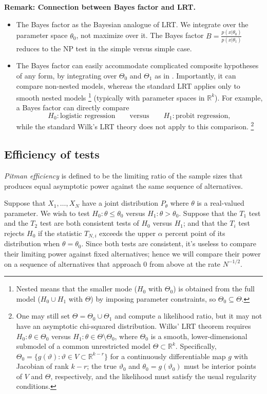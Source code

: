 \textbf{Remark: Connection between Bayes factor and LRT.}
\begin{itemize}
    \item The Bayes factor as the Bayesian analogue of LRT. We integrate over the parameter space $\theta_0$, not maximize over it. 
    The Bayes factor $B=\frac{p(x|\theta_0)}{p(x|\theta_1)}$ reduces to the NP test in the simple versus simple case.
    \item The Bayes factor can easily accommodate complicated composite hypotheses of any form, by integrating over $\Theta_0$ and $\Theta_1$ as in .
    Importantly, it can compare non-nested models, whereas the standard LRT applies only to smooth nested models
    \footnote{Nested means that the smaller mode ($H_0$ with $\Theta_0$) is obtained from the full model ($H_0 \cup H_1$ with $\Theta$) by imposing parameter constraints, so $\Theta_0\subseteq\Theta$.}
    (typically with parameter spaces in $\mathbb{R}^k$). For example, a Bayes factor can directly compare
    \[
    H_0:\text{logistic regression}
    \qquad\text{versus}\qquad
    H_1:\text{probit regression},
    \]
    while the standard Wilk's LRT theory does not apply to this comparison.
    \footnote{One may still set $\Theta=\Theta_0\cup\Theta_1$ and compute a likelihood ratio, but it may not have an asymptotic chi-squared distribution. Wilks' LRT theorem requires $H_0:\theta\in\Theta_0$ versus $H_1:\theta\in\Theta\setminus\Theta_0$, where $\Theta_0$ is a smooth, lower-dimensional submodel of a common unrestricted model $\Theta\subset\mathbb R^k$. Specifically, $\Theta_0=\{g(\vartheta):\vartheta\in V\subset\mathbb R^{k-r}\}$ for a continuously differentiable map $g$ with Jacobian of rank $k-r$; the true $\vartheta_0$ and $\theta_0=g(\vartheta_0)$ must be interior points of $V$ and $\Theta$, respectively, and the likelihood must satisfy the usual regularity conditions.}
\end{itemize}


\subsection{Efficiency of tests}
\emph{Pitman efficiency} is defined to be the limiting ratio of the sample sizes that produces equal asymptotic power against the same sequence of alternatives.

Suppose that $X_1, \ldots, X_N$ have a joint distribution $P_{\theta}$ where $\theta$ is a real-valued parameter. We wish to test $H_0: \theta \le \theta_0$ versus $H_1: \theta > \theta_0$. Suppose that the $T_1$ test and the $T_2$ test are both consistent tests of $H_0$ versus $H_1$; and that the $T_i$ test rejects $H_0$ if the statistic $T_{N, i}$ exceeds the upper $\alpha$ percent point of its distribution when $\theta = \theta_0$. Since both tests are consistent, it's useless to compare their limiting power against fixed alternatives; hence we will compare their power on a sequence of alternatives that approach 0 from above at the rate $N^{-1/2}$. 

